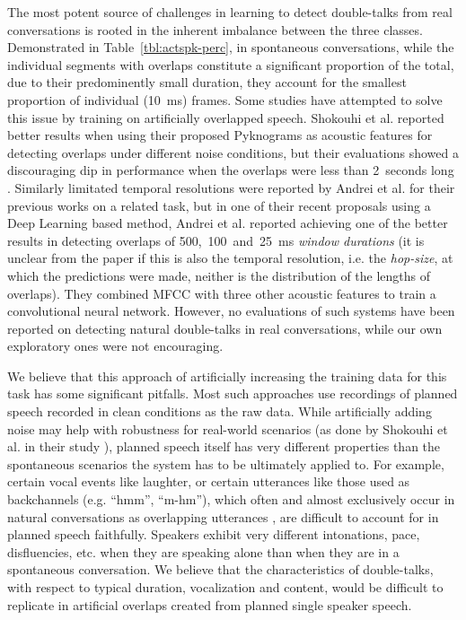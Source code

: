 \documentclass[a4paper]{article}
\begin{document}
The most potent source of challenges in learning to detect double-talks from real conversations
is rooted in the inherent imbalance between the three classes.
Demonstrated in Table~\ref{tbl:actspk-perc}, in spontaneous conversations,
while the individual segments with overlaps constitute a significant proportion of the total,
due to their predominently small duration,
they account for the smallest proportion of individual (10~ms) frames.
Some studies have attempted to solve this issue by training on artificially overlapped speech.
Shokouhi et al. reported better results when using their proposed Pyknograms as acoustic features for detecting overlaps under different noise conditions,
but their evaluations showed a discouraging dip in performance when the overlaps were less than 2~seconds long \cite{shokouhi_teager_2017}.
Similarly limitated temporal resolutions were reported by Andrei et al. for their previous works on a related task,
but in one of their recent proposals using a Deep Learning based method,
Andrei et al. reported achieving one of the better results in detecting overlaps of
500,~100~and~25~ms \textit{window durations} \cite{AndreiDetectingOverlappedSpeech2017}
(it is unclear from the paper if this is also the temporal resolution, i.e. the \textit{hop-size}, at which the predictions were made, neither is the distribution of the lengths of overlaps).
They combined MFCC with three other acoustic features to train a convolutional neural network.
However, no evaluations of such systems have been reported on detecting natural double-talks in real conversations,
while our own exploratory ones were not encouraging.

We believe that this approach of artificially increasing the training data for
this task has some significant pitfalls.
Most such approaches use recordings of planned speech recorded in clean conditions as the raw data.
While artificially adding noise may help with robustness for real-world scenarios
(as done by Shokouhi et al. in their study \cite{shokouhi_teager_2017}),
planned speech itself has very different properties than
the spontaneous scenarios the system has to be ultimately applied to.
For example, certain vocal events like laughter,
or certain utterances like those used as backchannels (e.g. ``hmm'', ``m-hm''),
which often and almost exclusively occur in natural conversations as overlapping utterances \cite{GeigerUsinglinguisticinformation2013},
are difficult to account for in planned speech faithfully.
Speakers exhibit very different intonations, pace, disfluencies, etc. when
they are speaking alone than when they are in a spontaneous conversation.
We believe that the characteristics of double-talks,
with respect to typical duration, vocalization and content,
would be difficult to replicate in artificial overlaps created from planned single speaker speech.
\end{document}
